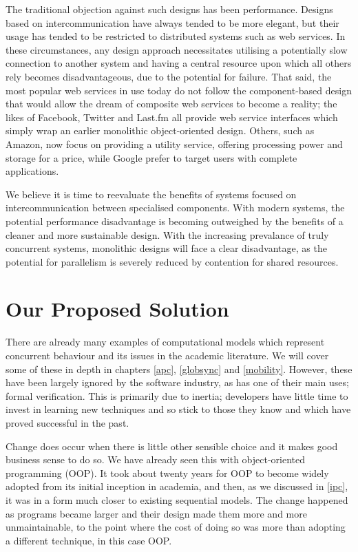 The traditional objection against such designs has been performance.
Designs based on intercommunication have always tended to be more
elegant, but their usage has tended to be restricted to distributed
systems such as web services.  In these circumstances, any design
approach necessitates utilising a potentially slow connection to
another system and having a central resource upon which all others
rely becomes disadvantageous, due to the potential for failure.  That
said, the most popular web services in use today do not follow the
component-based design that would allow the dream of composite web
services\cite{cashews-sem} to become a reality; the likes of Facebook,
Twitter and Last.fm \cite{facebook, amazon, twitter, lastfm} all
provide web service interfaces which simply wrap an earlier monolithic
object-oriented design.  Others, such as Amazon\cite{amazon}, now
focus on providing a utility service, offering processing power and
storage for a price, while Google\cite{google} prefer to target users
with complete applications.

We believe it is time to reevaluate the benefits of systems focused on
intercommunication between specialised components.  With modern
systems, the potential performance disadvantage is becoming outweighed
by the benefits of a cleaner and more sustainable design.  With the
increasing prevalance of truly concurrent systems, monolithic designs
will face a clear disadvantage, as the potential for parallelism is
severely reduced by contention for shared resources.

\section{Our Proposed Solution}
\label{solution}

There are already many examples of computational models which
represent concurrent behaviour and its issues in the academic
literature.  We will cover some of these in depth in chapters
\ref{apc}, \ref{globsync} and \ref{mobility}.  However, these have
been largely ignored by the software industry, as has one of their
main uses; formal verification.  This is primarily due to inertia;
developers have little time to invest in learning new techniques and
so stick to those they know and which have proved successful in the
past.

Change does occur when there is little other sensible choice and it
makes good business sense to do so.  We have already seen this with
object-oriented programming (OOP). It took about twenty years for OOP
to become widely adopted from its initial inception in academia, and
then, as we discussed in \ref{ipc}, it was in a form much closer to
existing sequential models.  The change happened as programs became
larger and their design made them more and more unmaintainable, to the
point where the cost of doing so was more than adopting a different
technique, in this case OOP.

